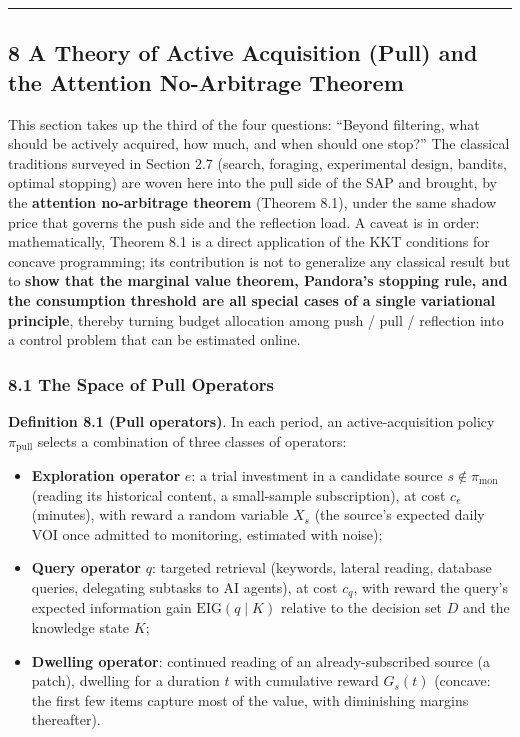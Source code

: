 \documentclass[
  11pt]{article}
\providecommand{\tightlist}{%
  \setlength{\itemsep}{0pt}\setlength{\parskip}{0pt}}
\begin{document}
\begin{center}\rule{0.5\linewidth}{0.5pt}\end{center}

\subsection{8 A Theory of Active Acquisition (Pull) and the Attention
No-Arbitrage
Theorem}\label{a-theory-of-active-acquisition-pull-and-the-attention-no-arbitrage-theorem}

This section takes up the third of the four questions: ``Beyond
filtering, what should be actively acquired, how much, and when should
one stop?'' The classical traditions surveyed in Section 2.7 (search,
foraging, experimental design, bandits, optimal stopping) are woven here
into the pull side of the SAP and brought, by the \textbf{attention
no-arbitrage theorem} (Theorem 8.1), under the same shadow price that
governs the push side and the reflection load. A caveat is in order:
mathematically, Theorem 8.1 is a direct application of the KKT
conditions for concave programming; its contribution is not to
generalize any classical result but to \textbf{show that the marginal
value theorem, Pandora's stopping rule, and the consumption threshold
are all special cases of a single variational principle}, thereby
turning budget allocation among push / pull / reflection into a control
problem that can be estimated online.

\subsubsection{8.1 The Space of Pull
Operators}\label{the-space-of-pull-operators}

\textbf{Definition 8.1 (Pull operators)}. In each period, an
active-acquisition policy \(\pi_{\mathrm{pull}}\) selects a combination
of three classes of operators:

\begin{itemize}
\tightlist
\item
  \textbf{Exploration operator} \(e\): a trial investment in a candidate
  source \(s \notin \pi_{\mathrm{mon}}\) (reading its historical
  content, a small-sample subscription), at cost \(c_e\) (minutes), with
  reward a random variable \(X_s\) (the source's expected daily VOI once
  admitted to monitoring, estimated with noise);
\item
  \textbf{Query operator} \(q\): targeted retrieval (keywords, lateral
  reading, database queries, delegating subtasks to AI agents), at cost
  \(c_q\), with reward the query's expected information gain
  \(\mathrm{EIG}(q \mid K)\) relative to the decision set \(D\) and the
  knowledge state \(K\);
\item
  \textbf{Dwelling operator}: continued reading of an already-subscribed
  source (a patch), dwelling for a duration \(t\) with cumulative reward
  \(G_s(t)\) (concave: the first few items capture most of the value,
  with diminishing margins thereafter).
\end{itemize}
\end{document}
